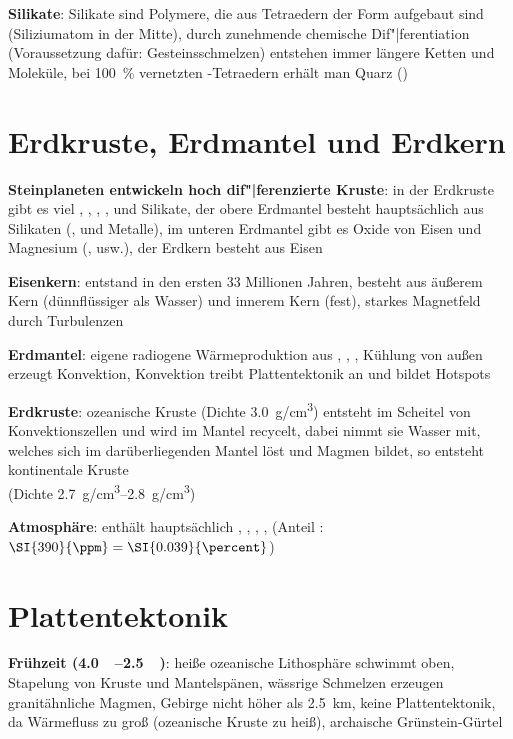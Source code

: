 \textbf{Silikate}:
Silikate sind Polymere, die aus Tetraedern der Form  aufgebaut sind
(Siliziumatom in der Mitte),
durch zunehmende chemische Dif"|ferentiation (Voraussetzung dafür: Gesteinsschmelzen)
entstehen immer längere Ketten und Moleküle,
bei \SI{100}{\percent} vernetzten -Tetraedern erhält man Quarz ()

\section{%
    Erdkruste, Erdmantel und Erdkern%
}

\textbf{Steinplaneten entwickeln hoch dif"|ferenzierte Kruste}:
in der Erdkruste gibt es viel , , , ,  und Silikate,
der obere Erdmantel besteht hauptsächlich aus Silikaten (,  und Metalle),
im unteren Erdmantel gibt es Oxide von Eisen und Magnesium (,  usw.),
der Erdkern besteht aus Eisen

\textbf{Eisenkern}:
entstand in den ersten 33 Millionen Jahren,
besteht aus äußerem Kern (dünnflüssiger als Wasser) und innerem Kern (fest),
starkes Magnetfeld durch Turbulenzen

\textbf{Erdmantel}:
eigene radiogene Wärmeproduktion aus , , ,
Kühlung von außen erzeugt Konvektion,
Konvektion treibt Plattentektonik an und bildet Hotspots

\textbf{Erdkruste}:
ozeanische Kruste (Dichte \SI{3.0}{\gram/\centi\meter\cubed})
entsteht im Scheitel von Konvektionszellen und wird im Mantel recycelt,
dabei nimmt sie Wasser mit, welches sich im darüberliegenden Mantel löst und Magmen bildet,
so entsteht kontinentale Kruste\\
(Dichte \SIrange{2.7}{2.8}{\gram/\centi\meter\cubed})

\textbf{Atmosphäre}:
enthält hauptsächlich , , , , 
(Anteil : $\SI{390}{\ppm} = \SI{0.039}{\percent}$)

\section{%
    Plattentektonik%
}

\textbf{Frühzeit (\SIrange{4.0}{2.5}{\giga\year})}:
heiße ozeanische Lithosphäre schwimmt oben,
Stapelung von Kruste und Mantelspänen,
wässrige Schmelzen erzeugen granitähnliche Magmen,
Gebirge nicht höher als \SI{2.5}{\kilo\meter},
keine Plattentektonik, da Wärmefluss zu groß (ozeanische Kruste zu heiß),
archaische Grünstein-Gürtel

